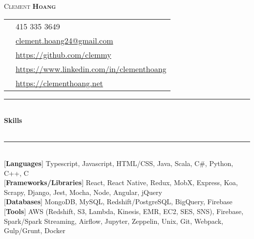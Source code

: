 \documentclass[10pt]{article}
\newcommand{\cvtitle}[4] {%
	{\LARGE\color{#2}\textsc{#1}}\hspace{\stretch{3}}{\large \textbf{#3}}\\[#4]}
\newcommand{\positionedbox}[3]{%
	\begin{minipage}{#2}
		\begin{flush#1}
			#3
		\end{flush#1}
	\end{minipage}}
\newcommand{\cvsectiontitle}[1]{%
	\rule{\linewidth}{0.2mm}\\%
		{\large\indent\textbf{#1}}\\%
	\\[-6.5mm]\rule{\linewidth}{0.2mm}\\[2mm]%
	}
\begin{document}
\cvtitle{Clement \textbf{Hoang}}{BrickRed}{}{0.3cm}
\positionedbox{left}{0.7\textwidth}{
	\begin{tabular}{ c l }
		{\FA \faPhone} & 415 335 3649 \\
		{\FA \faEnvelope} & \href{mailto:clement.hoang24@gmail.com}{clement.hoang24@gmail.com} \\
		{\FA \faGithub} & \href{https://github.com/clemmy}{https://github.com/clemmy} \\
		{\FA \faLinkedIn} & \href{https://www.linkedin.com/in/clementhoang}{https://www.linkedin.com/in/clementhoang} \\
		{\FA \faFire} & \href{https://clementhoang.net}{https://clementhoang.net}
	\end{tabular}
}
\vspace{0.2cm}

\cvsectiontitle{Skills}
[\textbf{Languages}] Typescript, Javascript, HTML/CSS, Java, Scala, C\#, Python, C++, C \\[0.2cm]
[\textbf{Frameworks/Libraries}] React, React Native, Redux, MobX, Express, Koa, Scrapy, Django, Jest, Mocha, Node, Angular, jQuery \\[0.2cm]
[\textbf{Databases}] MongoDB, MySQL, Redshift/PostgreSQL, BigQuery, Firebase \\[0.2cm]
[\textbf{Tools}] AWS (Redshift, S3, Lambda, Kinesis, EMR, EC2, SES, SNS), Firebase, Spark/Spark Streaming, Airflow, Jupyter, Zeppelin, Unix, Git, Webpack, Gulp/Grunt, Docker
\end{document}
